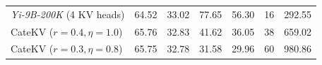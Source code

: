 \begin{table}[t]
{\begin{tabular}{l|cc|P{2.2cm}P{2.2cm}|P{2.2cm}P{2.2cm}}
\midrule
\textit{Yi-9B-200K} (4 KV heads) & 64.52 \color{gray}{(0.00)}& 33.02 \color{gray}{(0.00)}& 77.65 \color{gray}{($1.00\times$)} & 56.30 \color{gray}{($1.00\times$)} & 16 \color{gray}{($1.00\times$)} & 292.55 \color{gray}{($1.00\times$)}\\
CateKV ($r=0.4,\eta=1.0$)  & 65.76 \color{gray}{(+1.24)} & 32.83 \color{gray}{(-0.19)} & 41.62 \color{gray}{($1.87\times$)}& 36.05 \color{gray}{($1.56\times$)}& 38 \color{gray}{($2.38\times$)} & 659.02 \color{gray}{($2.25\times$)}\\
CateKV ($r=0.3,\eta=0.8$) & 65.75 \color{gray}{(+1.23)} & 32.78 \color{gray}{(-0.24)} & 31.58 \color{gray}{($2.46\times$)}& 29.96 \color{gray}{($1.88\times$)}& 60 \color{gray}{($3.75\times$)} & 980.86 \color{gray}{($3.35\times$)}\\

\bottomrule
\end{tabular}}
\label{tab:efficiency}
\vspace{-0.3cm}
\end{table}
